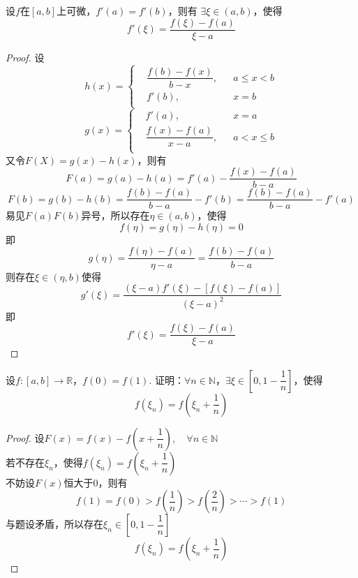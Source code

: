 \begin{theorem}[Flett中值定理]
    
    设$f$在$[a, b]$上可微，$f'(a) = f'(b)$，则有
    $\exists \xi \in (a, b)$，使得
    $$f'(\xi) = \dfrac{f(\xi) - f(a)}{\xi - a}$$

\end{theorem}

\begin{proof}
    
    设$$h(x) = \left\{
        \begin{aligned}
            & \dfrac{f(b) - f(x)}{b - x}, &&a \leq x < b \\
            &f'(b), &&x = b \\
        \end{aligned}
    \right.
    $$
    $$g(x) = \left\{
        \begin{aligned}
            &f'(a), &&x = a \\
            & \dfrac{f(x) - f(a)}{x - a}, &&a < x \leq b \\
        \end{aligned}
    \right.
    $$
    又令$F(X) = g(x) - h(x)$，则有
    $$F(a) = g(a) - h(a) = f'(a) - \dfrac{f(x) - f(a)}{b - a}$$
    $$F(b) = g(b) - h(b) = \dfrac{f(b) - f(a)}{b - a}  - f'(b) = \dfrac{f(b) - f(a)}{b - a} - f'(a)$$
    易见$F(a)F(b)$异号，所以存在$\eta \in (a, b)$，使得
    $$ f(\eta) = g(\eta) - h(\eta) = 0$$
    即
    $$g(\eta) = \dfrac{f(\eta) - f(a)}{\eta - a } =  \dfrac{f(b) - f(a)}{b - a}$$
    则存在$\xi \in (\eta, b)$使得
    $$g'(\xi) = \dfrac{(\xi - a)f'(\xi) - [f(\xi) - f(a)]}{(\xi - a)^2}$$
    即
    $$f'(\xi) = \dfrac{f(\xi) - f(a)}{\xi - a}$$

\end{proof}

\begin{proposition}

    设$f:[a, b]\to \mathbb{R}$，$f(0) = f(1)$.
    证明：$\forall n \in \mathbb{N}$，$\exists \xi \in \left[ 0, 1 - \dfrac{1}{n} \right]$，使得
    $$f(\xi_n) = f\left( \xi_n + \dfrac{1}{n} \right)$$

\end{proposition}

\begin{proof}
    
    设$F(x) = f(x) - f\left( x + \dfrac{1}{n} \right), \quad \forall n \in \mathbb{N}$ \\
    若不存在$\xi_n$，使得$f(\xi_n) = f\left( \xi_n +\dfrac{1}{n} \right)$ \\
    不妨设$F(x)$恒大于$0$，则有
    $$f(1) = f(0) > f\left( \dfrac{1}{n} \right) > f\left( \dfrac{2}{n} \right) > \cdots > f(1)$$
    与题设矛盾，所以存在$\xi_n \in \left[ 0, 1 - \dfrac{1}{n} \right]$
    $$f(\xi_n) = f\left( \xi_n + \dfrac{1}{n} \right)$$

\end{proof}


